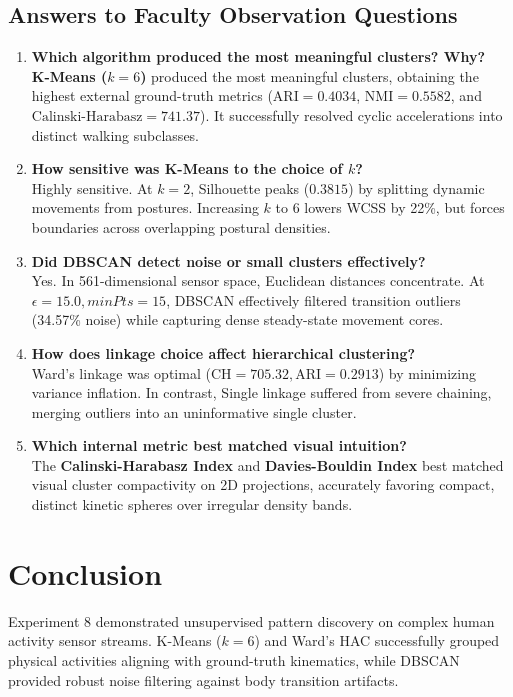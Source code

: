 \documentclass[12pt,a4paper]{article}
\begin{document}
\subsection{Answers to Faculty Observation Questions}
\begin{enumerate}
    \item \textbf{Which algorithm produced the most meaningful clusters? Why?} \\
    \textbf{K-Means ($k=6$)} produced the most meaningful clusters, obtaining the highest external ground-truth metrics ($\text{ARI} = 0.4034$, $\text{NMI} = 0.5582$, and $\text{Calinski-Harabasz} = 741.37$). It successfully resolved cyclic accelerations into distinct walking subclasses.
    \item \textbf{How sensitive was K-Means to the choice of $k$?} \\
    Highly sensitive. At $k=2$, Silhouette peaks ($0.3815$) by splitting dynamic movements from postures. Increasing $k$ to 6 lowers WCSS by 22\%, but forces boundaries across overlapping postural densities.
    \item \textbf{Did DBSCAN detect noise or small clusters effectively?} \\
    Yes. In 561-dimensional sensor space, Euclidean distances concentrate. At $\epsilon=15.0, minPts=15$, DBSCAN effectively filtered transition outliers (34.57\% noise) while capturing dense steady-state movement cores.
    \item \textbf{How does linkage choice affect hierarchical clustering?} \\
    Ward's linkage was optimal ($\text{CH} = 705.32, \text{ARI} = 0.2913$) by minimizing variance inflation. In contrast, Single linkage suffered from severe chaining, merging outliers into an uninformative single cluster.
    \item \textbf{Which internal metric best matched visual intuition?} \\
    The \textbf{Calinski-Harabasz Index} and \textbf{Davies-Bouldin Index} best matched visual cluster compactivity on 2D projections, accurately favoring compact, distinct kinetic spheres over irregular density bands.
\end{enumerate}

\section{Conclusion}
Experiment 8 demonstrated unsupervised pattern discovery on complex human activity sensor streams. K-Means ($k=6$) and Ward's HAC successfully grouped physical activities aligning with ground-truth kinematics, while DBSCAN provided robust noise filtering against body transition artifacts.
\end{document}
